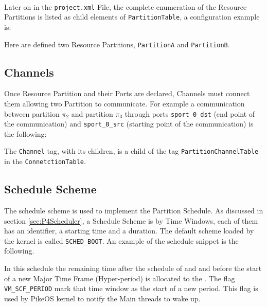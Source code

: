 \paragraph{} Later on in the \verb|project.xml| File, the complete enumeration of the Resource Partitions is listed as child elements of \verb|PartitionTable|, a configuration example is:

Here are defined two Resource Partitions, \verb|PartitionA| and \verb|PartitionB|.

\subsection{Channels}
Once Resource Partition and their Ports are declared, Channels must connect them allowing two Partition to communicate. For example a communication between partition $\pi_2$ and partition $\pi_3$ through ports \verb|sport_0_dst| (end point of the communication) and \verb|sport_0_src| (starting point of the communication) is the following:

The \verb|Channel| tag, with its children, is a child of the tag \verb|PartitionChannelTable| in the \verb|ConnetctionTable|.

\subsection{Schedule Scheme}
The schedule scheme is used to implement the Partition Schedule. As discussed in section \ref{sec:P4Scheduler}, a Schedule Scheme is by Time Windows, each of them has an identifier, a starting time and a duration. The default scheme loaded by the kernel is called \verb|SCHED_BOOT|. An example of the schedule snippet is the following.

In this schedule the remaining time after the schedule of  and  and before the start of a new Major Time Frame (Hyper-period) is allocated to the . The flag \verb|VM_SCF_PERIOD| mark that time window as the start of a new period. This flag is used by PikeOS kernel to notify the Main threads to wake up.